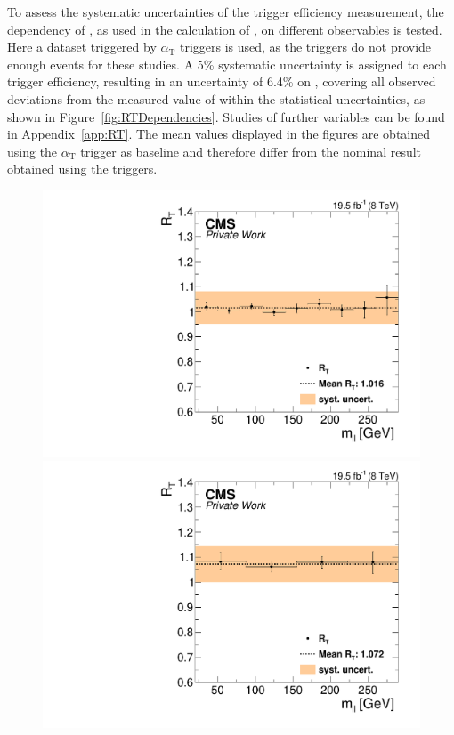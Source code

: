 To assess the systematic uncertainties of the trigger efficiency measurement, the dependency of \RT, as used in the calculation of \Rsfof, on different observables is tested. Here a dataset triggered by $\alpha_\mathrm{T}$ triggers is used, as the \HT triggers do not provide enough events for these studies. A 5\% systematic uncertainty is assigned to each trigger efficiency, resulting in an uncertainty of 6.4\% on \RT, covering all observed deviations from the measured value of \RT within the statistical uncertainties, as shown in Figure~\ref{fig:RTDependencies}. Studies of further variables can be found in Appendix~\ref{app:RT}. The mean \RT values displayed in the figures are obtained using the $\alpha_{\mathrm{T}}$ trigger as baseline and therefore differ from the nominal result obtained using the \HT triggers. 
\begin{figure}[htbp]
\centering
\begin{minipage}[t]{0.49\textwidth}
  \includegraphics[width=\textwidth]{plots/BG/trigger/Triggereff_SFvsOF_Syst_AlphaT_HighHTExclusiveCentral_Full2012_Mll_None.pdf}
\end{minipage}
\begin{minipage}[t]{0.49\textwidth}
\includegraphics[width=\textwidth]{plots/BG/trigger/Triggereff_SFvsOF_Syst_AlphaT_HighHTExclusiveForward_Full2012_Mll_None.pdf}

\end{minipage}
\end{figure}

